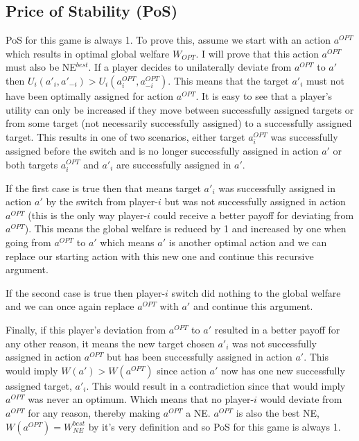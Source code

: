 \documentclass[11pt, onecolumn, compsoc, letterpaper]{article}
\begin{document}
\subsection{Price of Stability (PoS)}
PoS for this game is always 1. To prove this, assume we start with an action $a^{OPT}$ which results in optimal global welfare $W_{OPT}$. I will prove that this action $a^{OPT}$ must also be NE$^{best}$. If a player decides to unilaterally deviate from $a^{OPT}$ to $a'$ then $U_i(a'_i, a'_{-i}) > U_i(a^{OPT}_i, a^{OPT}_{-i})$. This means that the target $a'_i$ must not have been optimally assigned for action $a^{OPT}$. It is easy to see that a player's utility can only be increased if they move between successfully assigned targets or from some target (not necessarily successfully assigned) to a successfully assigned target. This results in one of two scenarios, either target $a^{OPT}_i$ was successfully assigned before the switch and is no longer successfully assigned in action $a'$ or both targets $a^{OPT}_i$ and $a'_i$ are successfully assigned in $a'$. 

If the first case is true then that means target $a'_i$ was successfully assigned in action $a'$ by the switch from player-$i$ but was not successfully assigned in action $a^{OPT}$ (this is the only way player-$i$ could receive a better payoff for deviating from $a^{OPT}$). This means the global welfare is reduced by 1 and increased by one when going from $a^{OPT}$ to $a'$ which means $a'$ is another optimal action and we can replace our starting action with this new one and continue this recursive argument.

If the second case is true then player-$i$ switch did nothing to the global welfare and we can once again replace $a^{OPT}$ with $a'$ and continue this argument.

Finally, if this player's deviation from $a^{OPT}$ to $a'$ resulted in a better payoff for any other reason, it means the new target chosen $a'_i$ was not successfully assigned in action $a^{OPT}$ but has been successfully assigned in action $a'$. This would imply $W(a') > W(a^{OPT})$ since action $a'$ now has one new successfully assigned target, $a'_i$. This would result in a contradiction since that would imply $a^{OPT}$ was never an optimum. Which means that no player-$i$ would deviate from $a^{OPT}$ for any reason, thereby making $a^{OPT}$ a NE. $a^{OPT}$ is also the best NE, $W(a^{OPT}) = W_{NE}^{best}$ by it's very definition and so PoS for this game is always 1.
\end{document}
